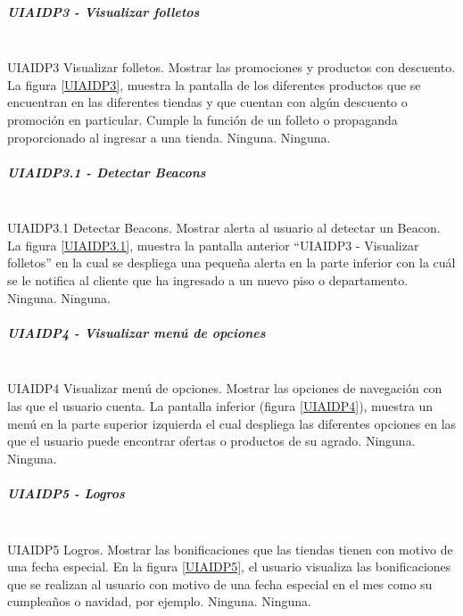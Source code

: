 \subparagraph{UIAIDP3 - Visualizar folletos} ~\\
\FloatBarrier
{} %
{UIAIDP3} %
{Visualizar folletos.}  %
{Mostrar las promociones y productos con descuento.} %
{La figura \ref{UIAIDP3}, muestra la pantalla de los diferentes productos que se encuentran en las diferentes tiendas y que cuentan con algún descuento o promoción en particular. Cumple la función de un folleto o propaganda proporcionado al ingresar a una tienda.} %
{Ninguna.} %
{Ninguna.} %
\FloatBarrier

\subparagraph{UIAIDP3.1 - Detectar Beacons} ~\\
\FloatBarrier
{} %
{UIAIDP3.1} %
{Detectar Beacons.}  %
{Mostrar alerta al usuario al detectar un Beacon.} %
{La figura \ref{UIAIDP3.1}, muestra la pantalla anterior ``UIAIDP3 - Visualizar folletos'' en la cual se despliega una pequeña alerta en la parte inferior con la cuál se le notifica al cliente que ha ingresado a un nuevo piso o departamento.} %
{Ninguna.} %
{Ninguna.} %
\FloatBarrier

\subparagraph{UIAIDP4 - Visualizar menú de opciones} ~\\
\FloatBarrier
{} %
{UIAIDP4} %
{Visualizar menú de opciones.}  %
{Mostrar las opciones de navegación con las que el usuario cuenta.} %
{La pantalla inferior (figura \ref{UIAIDP4}),  muestra un menú en la parte superior izquierda el cual despliega las diferentes opciones en las que el usuario puede encontrar ofertas o productos de su agrado.} %
{Ninguna.} %
{Ninguna.} %
\FloatBarrier

\subparagraph{UIAIDP5 - Logros} ~\\
\FloatBarrier
{} %
{UIAIDP5} %
{Logros.}  %
{Mostrar las bonificaciones que las tiendas tienen con motivo de una fecha especial.} %
{En la figura \ref{UIAIDP5}, el usuario visualiza las bonificaciones que se realizan al usuario con motivo de una fecha especial en el mes como su cumpleaños o navidad, por ejemplo.} %
{Ninguna.} %
{Ninguna.} %
\FloatBarrier

